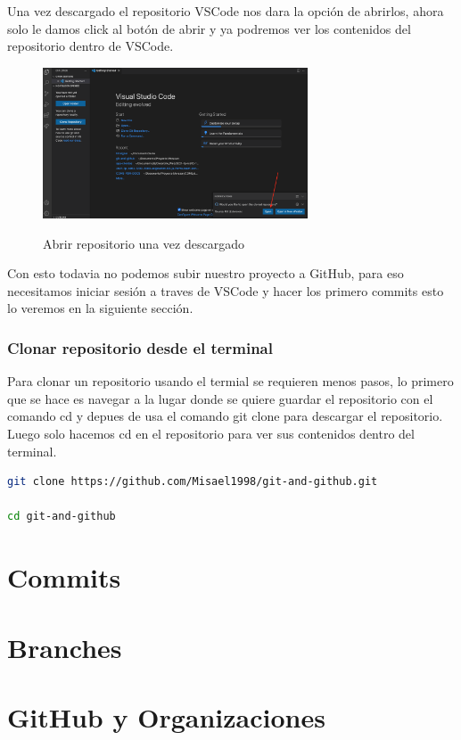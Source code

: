 \documentclass[11pt, oneside]{article}
\begin{document}
Una vez descargado el repositorio VSCode nos dara la opción de abrirlos, ahora solo le damos click al botón de abrir y ya podremos ver los contenidos del repositorio dentro de VSCode.

\begin{figure}[H]
  \centering
  \caption{Abrir repositorio una vez descargado}
  \includegraphics[width=0.70\textwidth]{./img/github-new-repo-12.png}
  \label{fig:github-new-repo-12}
\end{figure}

Con esto todavia no podemos subir nuestro proyecto a GitHub, para eso necesitamos iniciar sesión a traves de VSCode y hacer los primero commits esto lo veremos en la siguiente sección.

\subsubsection{Clonar repositorio desde el terminal}

Para clonar un repositorio usando el termial se requieren menos pasos, lo primero que se hace es navegar a la lugar donde se quiere guardar el repositorio con el comando cd y depues de usa el comando git clone para descargar el repositorio. Luego solo hacemos cd en el repositorio para ver sus contenidos dentro del terminal.

\begin{lstlisting}[language=bash,caption={Clonar repositorio desde el terminal}]
git clone https://github.com/Misael1998/git-and-github.git

cd git-and-github
\end{lstlisting}

\section{Commits}

\section{Branches}

\section{GitHub y Organizaciones}
\end{document}

